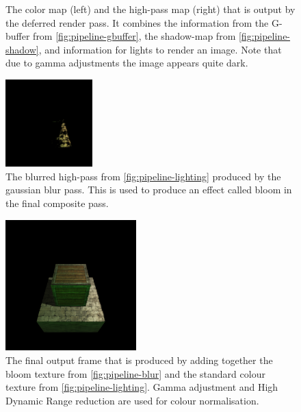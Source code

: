 \documentclass[format=sigconf]{acmart}
\begin{document}
\begin{figure}[h]
\begin{center}
\begin{minipage}{.2\textwidth}
    \end{minipage}
  \end{center}
  \caption{The color map (left) and the high-pass map (right) that is output by the deferred render pass. It combines the information from the G-buffer from \autoref{fig:pipeline-gbuffer}, the shadow-map from \autoref{fig:pipeline-shadow}, and information for lights to render an image. Note that due to gamma adjustments the image appears quite dark.}
  \label{fig:pipeline-lighting}
\end{figure}

\begin{figure}[h]
  \begin{center}
    \includegraphics[width=0.3\textwidth]{pipeline-blur.png}
  \end{center}
  \caption{The blurred high-pass from \autoref{fig:pipeline-lighting} produced by the gaussian blur pass. This is used to produce an effect called bloom in the final composite pass.}
  \label{fig:pipeline-blur}
\end{figure}

\begin{figure}[H]
  \begin{center}
    \includegraphics[width=0.45\textwidth]{pipeline-frame.png}
  \end{center}
  \caption{The final output frame that is produced by adding together the bloom texture from \autoref{fig:pipeline-blur} and the standard colour texture from \autoref{fig:pipeline-lighting}. Gamma adjustment and High Dynamic Range reduction are used for colour normalisation.}
  \label{fig:pipeline-frame}
\end{figure}
\end{document}
